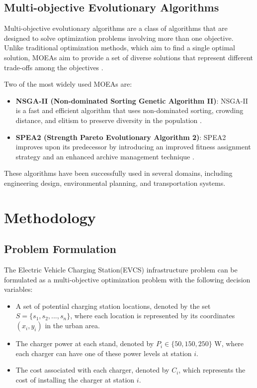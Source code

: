 \documentclass[12pt]{report}
\begin{document}
\section{Multi-objective Evolutionary Algorithms}
Multi-objective evolutionary algorithms are a class of algorithms that are designed to solve optimization problems involving more than one objective. Unlike traditional optimization methods, which aim to find a single optimal solution, MOEAs aim to provide a set of diverse solutions that represent different trade-offs among the objectives \cite{ref5}.

Two of the most widely used MOEAs are:
\begin{itemize}
    \item \textbf{NSGA-II (Non-dominated Sorting Genetic Algorithm II)}: NSGA-II is a fast and efficient algorithm that uses non-dominated sorting, crowding distance, and elitism to preserve diversity in the population \cite{ref6}.
    \item \textbf{SPEA2 (Strength Pareto Evolutionary Algorithm 2)}: SPEA2 improves upon its predecessor by introducing an improved fitness assignment strategy and an enhanced archive management technique \cite{ref7}.
\end{itemize}

These algorithms have been successfully used in several domains, including engineering design, environmental planning, and transportation systems.

\chapter{Methodology}

\section{Problem Formulation}
The Electric Vehicle Charging Station(EVCS) infrastructure problem can be formulated as a multi-objective optimization problem with the following decision variables:
\begin{itemize}
    \item A set of potential charging station locations, denoted by the set $S = \{s_1, s_2, ..., s_n\}$, where each location is represented by its coordinates $(x_i, y_i)$ in the urban area.
    \item The charger power at each stand, denoted by $P_i \in \{50, 150, 250\}$ W, where each charger can have one of these power levels at station $i$.
    \item The cost associated with each charger, denoted by $C_i$, which represents the cost of installing the charger at station $i$.
\end{itemize}
\end{document}
